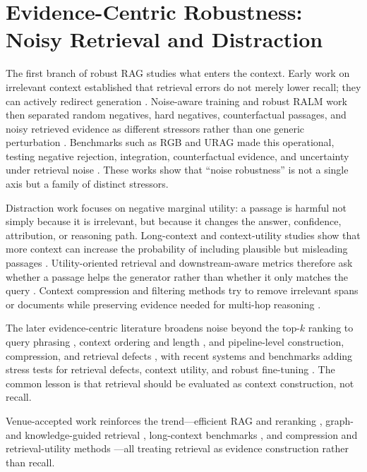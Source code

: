 \section{Evidence-Centric Robustness: Noisy Retrieval and Distraction}

The first branch of robust RAG studies what enters the context. Early work on irrelevant context established that retrieval errors do not merely lower recall; they can actively redirect generation \citep{irrelevantContext2023}. Noise-aware training and robust RALM work then separated random negatives, hard negatives, counterfactual passages, and noisy retrieved evidence as different stressors rather than one generic perturbation \citep{raat2024,rrag037,rrag091}. Benchmarks such as RGB and URAG made this operational, testing negative rejection, integration, counterfactual evidence, and uncertainty under retrieval noise \citep{rgb2023,rrag001}. These works show that ``noise robustness'' is not a single axis but a family of distinct stressors.

Distraction work focuses on negative marginal utility: a passage is harmful not simply because it is irrelevant, but because it changes the answer, confidence, attribution, or reasoning path. Long-context and context-utility studies show that more context can increase the probability of including plausible but misleading passages \citep{rrag003,rrag039,rrag032}. Utility-oriented retrieval and downstream-aware metrics therefore ask whether a passage helps the generator rather than whether it only matches the query \citep{rrag058,rrag067,rrag073,rrag081,rrag088}. Context compression and filtering methods try to remove irrelevant spans or documents while preserving evidence needed for multi-hop reasoning \citep{rrag044,chainOfNote2023,sufficientContext2024,rrag043,rrag048,rrag055}.

The later evidence-centric literature broadens noise beyond the top-$k$ ranking to query phrasing \citep{queryRobustness2025}, context ordering and length \citep{rrag140,rrag143,rrag154,rrag166,rrag168,rrag170}, and pipeline-level construction, compression, and retrieval defects \citep{rrag174,rrag179,rrag180,rrag181,rrag182,rrag183,rrag184}, with recent systems and benchmarks adding stress tests for retrieval defects, context utility, and robust fine-tuning \citep{rrag200,rrag201,rrag206,rrag210,rrag212,rrag215,rrag218,rrag219,rrag224,rrag225,rrag226}. The common lesson is that retrieval should be evaluated as context construction, not recall.

Venue-accepted work reinforces the trend---efficient RAG and reranking \citep{venueAcc013,venueAcc017,venueAcc018}, graph- and knowledge-guided retrieval \citep{venueAcc004,venueAcc006,venueAcc008,venueAcc009,venueAcc012,venueAcc023}, long-context benchmarks \citep{venueAcc028,venueAcc030}, and compression and retrieval-utility methods \citep{venueExtra003,venueExtra015,venueExtra007,venueExtra014,venueExtra002,venueExtra009,venueExtra013,venueExtra012,venueExtra008}---all treating retrieval as evidence construction rather than recall.

